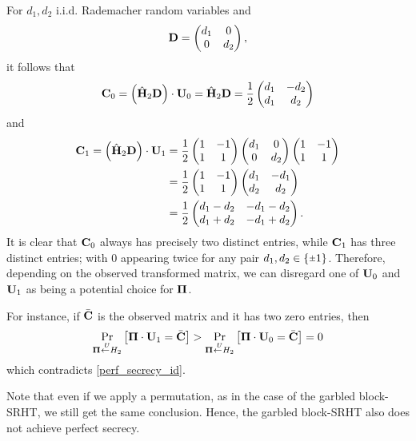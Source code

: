 \documentclass[journal,letterpaper,onecolumn,twoside,nofonttune]{IEEEtran}
\newcommand{\Ub}{\bold{U}}
\newcommand{\Pibold}{\bold{\Pi}}
\newcommand{\Cb}{\bold{C}}
\newcommand{\Db}{\bold{D}}
\newcommand{\Hbh}{\hat{\bold{H}}}
\newcommand{\rpm}{\raisebox{.2ex}{$\scriptstyle\pm$}}
\newcommand{\getsU}{\overset{\ U}{\gets}}
\begin{document}
For $d_1,d_2$ i.i.d. Rademacher random variables and
$$ \Db = \begin{pmatrix} d_1 & 0\\ 0 & d_2 \end{pmatrix} , $$
it follows that
\begin{align*}
  \Cb_0=\left(\Hbh_2\Db\right)\cdot\Ub_0 = \Hbh_2\Db = \frac{1}{2}\begin{pmatrix} d_1 & -d_2\\ d_1 & d_2\end{pmatrix}
\end{align*}
and
\begin{align*}
  \Cb_1=\left(\Hbh_2\Db\right)\cdot\Ub_1 &= \frac{1}{2} \begin{pmatrix} 1 & -1\\ 1 & 1\end{pmatrix} \begin{pmatrix} d_1 & 0\\ 0 & d_2 \end{pmatrix} \begin{pmatrix} 1 & -1\\ 1 & 1\end{pmatrix}\\
  &=\frac{1}{2} \begin{pmatrix} 1 & -1\\ 1 & 1\end{pmatrix} \begin{pmatrix} d_1 & -d_1\\ d_2 & d_2 \end{pmatrix}\\
  &= \frac{1}{2}\begin{pmatrix} d_1-d_2 & -d_1-d_2\\ d_1+d_2 & -d_1+d_2 \end{pmatrix} .
\end{align*}
It is clear that $\Cb_0$ always has precisely two distinct entries, while $\Cb_1$ has three distinct entries; with 0 appearing twice for any pair $d_1,d_2\in\{\rpm1\}$. Therefore, depending on the observed transformed matrix, we can disregard one of $\Ub_0$ and $\Ub_1$ as being a potential choice for $\Pibold$.

For instance, if $\bar{\Cb}$ is the observed matrix and it has two zero entries, then
$$ \Pr_{\Pibold\getsU H_2}\left[\Pibold\cdot\Ub_1=\bar{\Cb}\right] > \Pr_{\Pibold\getsU H_2}\left[\Pibold\cdot\Ub_0=\bar{\Cb}\right]=0 $$
which contradicts \eqref{perf_secrecy_id}.

Note that even if we apply a permutation, as in the case of the garbled block-SRHT, we still get the same conclusion. Hence, the garbled block-SRHT also does not achieve perfect secrecy.
\end{document}
